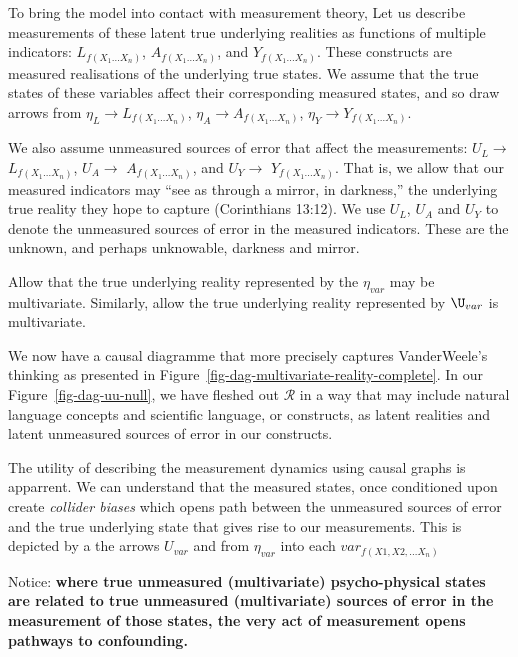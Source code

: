 \documentclass[
  singlecolumn]{report}
\begin{document}
To bring the model into contact with measurement theory, Let us describe
measurements of these latent true underlying realities as functions of
multiple indicators: \(L_{f(X_1\dots X_n)}\), \(A_{f(X_1\dots X_n)}\),
and \(Y_{f(X_1\dots X_n)}\). These constructs are measured realisations
of the underlying true states. We assume that the true states of these
variables affect their corresponding measured states, and so draw arrows
from \(\eta_L\rightarrow{L_{f(X_1\dots X_n)}}\),
\(\eta_A\rightarrow{A_{f(X_1\dots X_n)}}\),
\(\eta_Y\rightarrow{Y_{f(X_1\dots X_n)}}\).

We also assume unmeasured sources of error that affect the measurements:
\(U_{L} \rightarrow\) \(L_{f(X_1\dots X_n)}\), \(U_{A} \rightarrow\)
\(A_{f(X_1\dots X_n)}\), and \(U_{Y} \rightarrow\)
\(Y_{f(X_1\dots X_n)}\). That is, we allow that our measured indicators
may ``see as through a mirror, in darkness,'' the underlying true
reality they hope to capture (Corinthians 13:12). We use \(U_{L}\),
\(U_{A}\) and \(U_{Y}\) to denote the unmeasured sources of error in the
measured indicators. These are the unknown, and perhaps unknowable,
darkness and mirror.

Allow that the true underlying reality represented by the \(\eta_{var}\)
may be multivariate. Similarly, allow the true underlying reality
represented by \(\U_{var}\) is multivariate.

We now have a causal diagramme that more precisely captures
VanderWeele's thinking as presented in
Figure~\ref{fig-dag-multivariate-reality-complete}. In our
Figure~\ref{fig-dag-uu-null}, we have fleshed out \(\mathcal{R}\) in a
way that may include natural language concepts and scientific language,
or constructs, as latent realities and latent unmeasured sources of
error in our constructs.

The utility of describing the measurement dynamics using causal graphs
is apparrent. We can understand that the measured states, once
conditioned upon create \emph{collider biases} which opens path between
the unmeasured sources of error and the true underlying state that gives
rise to our measurements. This is depicted by a the arrows \(U_{var}\)
and from \(\eta_{var}\) into each \(var_{f(X1, X2,\dots X_n)}\)

Notice: \textbf{where true unmeasured (multivariate) psycho-physical
states are related to true unmeasured (multivariate) sources of error in
the measurement of those states, the very act of measurement opens
pathways to confounding.}
\end{document}
